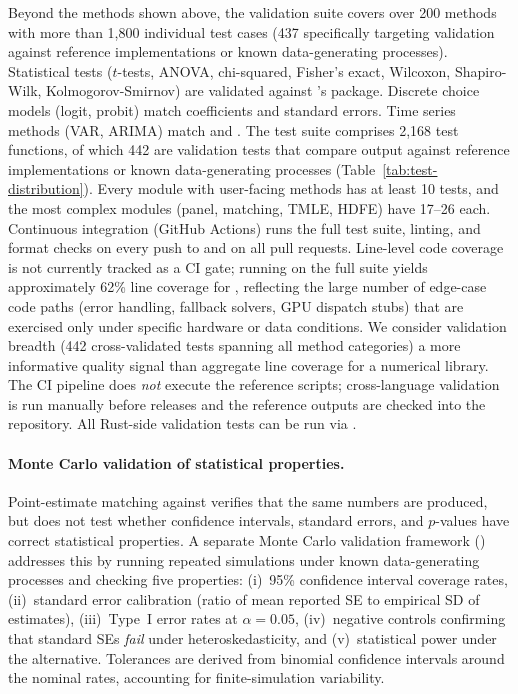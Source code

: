 Beyond the methods shown above, the validation suite covers over 200
methods with more than 1,800 individual test cases (437 specifically
targeting validation against  reference implementations or
known data-generating processes).
Statistical tests ($t$-tests, ANOVA, chi-squared, Fisher's exact,
Wilcoxon, Shapiro-Wilk, Kolmogorov-Smirnov) are validated against
's  package. Discrete choice models (logit,
probit) match  coefficients and standard errors. Time series
methods (VAR, ARIMA) match  and . The  test suite comprises 2{,}168 test functions,
of which 442 are validation tests that compare output against
 reference implementations or known data-generating
processes (Table~\ref{tab:test-distribution}).  Every module with
user-facing methods has at least 10 tests, and the most complex
modules (panel, matching, TMLE, HDFE) have 17--26 each.
Continuous integration (GitHub Actions) runs the full test suite,
 linting, and format checks on every push to
 and on all pull requests. Line-level code coverage is not
currently tracked as a CI gate; running  on the
full suite yields approximately 62\% line coverage for ,
reflecting the large number of edge-case code paths (error handling,
fallback solvers, GPU dispatch stubs) that are exercised only under
specific hardware or data conditions.  We consider validation breadth
(442 cross-validated tests spanning all method categories) a more
informative quality signal than aggregate line coverage for a
numerical library.  The CI pipeline does \emph{not} execute the
 reference scripts; cross-language validation is run
manually before releases and the reference outputs are checked into
the repository.  All Rust-side validation tests can be run via
.

\paragraph{Monte Carlo validation of statistical properties.}
Point-estimate matching against  verifies that the same
numbers are produced, but does not test whether confidence intervals,
standard errors, and $p$-values have correct statistical properties.
A separate Monte Carlo validation framework
() addresses this by running repeated
simulations under known data-generating processes and checking five
properties: (i)~95\% confidence interval coverage rates, (ii)~standard
error calibration (ratio of mean reported SE to empirical SD of
estimates), (iii)~Type~I error rates at $\alpha = 0.05$, (iv)~negative
controls confirming that standard SEs \emph{fail} under
heteroskedasticity, and (v)~statistical power under the alternative.
Tolerances are derived from binomial confidence intervals around the
nominal rates, accounting for finite-simulation variability.

